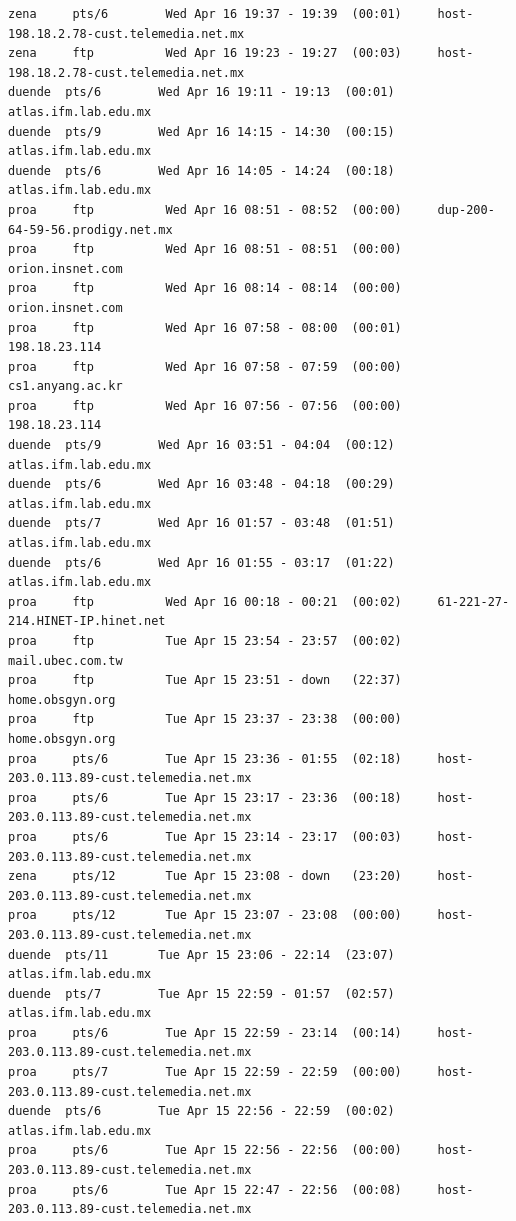 \begin{lstlisting}[style=terminal]
zena     pts/6        Wed Apr 16 19:37 - 19:39  (00:01)     host-198.18.2.78-cust.telemedia.net.mx
zena     ftp          Wed Apr 16 19:23 - 19:27  (00:03)     host-198.18.2.78-cust.telemedia.net.mx
duende  pts/6        Wed Apr 16 19:11 - 19:13  (00:01)     atlas.ifm.lab.edu.mx
duende  pts/9        Wed Apr 16 14:15 - 14:30  (00:15)     atlas.ifm.lab.edu.mx
duende  pts/6        Wed Apr 16 14:05 - 14:24  (00:18)     atlas.ifm.lab.edu.mx
proa     ftp          Wed Apr 16 08:51 - 08:52  (00:00)     dup-200-64-59-56.prodigy.net.mx
proa     ftp          Wed Apr 16 08:51 - 08:51  (00:00)     orion.insnet.com
proa     ftp          Wed Apr 16 08:14 - 08:14  (00:00)     orion.insnet.com
proa     ftp          Wed Apr 16 07:58 - 08:00  (00:01)     198.18.23.114
proa     ftp          Wed Apr 16 07:58 - 07:59  (00:00)     cs1.anyang.ac.kr
proa     ftp          Wed Apr 16 07:56 - 07:56  (00:00)     198.18.23.114
duende  pts/9        Wed Apr 16 03:51 - 04:04  (00:12)     atlas.ifm.lab.edu.mx
duende  pts/6        Wed Apr 16 03:48 - 04:18  (00:29)     atlas.ifm.lab.edu.mx
duende  pts/7        Wed Apr 16 01:57 - 03:48  (01:51)     atlas.ifm.lab.edu.mx
duende  pts/6        Wed Apr 16 01:55 - 03:17  (01:22)     atlas.ifm.lab.edu.mx
proa     ftp          Wed Apr 16 00:18 - 00:21  (00:02)     61-221-27-214.HINET-IP.hinet.net
proa     ftp          Tue Apr 15 23:54 - 23:57  (00:02)     mail.ubec.com.tw
proa     ftp          Tue Apr 15 23:51 - down   (22:37)     home.obsgyn.org
proa     ftp          Tue Apr 15 23:37 - 23:38  (00:00)     home.obsgyn.org
proa     pts/6        Tue Apr 15 23:36 - 01:55  (02:18)     host-203.0.113.89-cust.telemedia.net.mx
proa     pts/6        Tue Apr 15 23:17 - 23:36  (00:18)     host-203.0.113.89-cust.telemedia.net.mx
proa     pts/6        Tue Apr 15 23:14 - 23:17  (00:03)     host-203.0.113.89-cust.telemedia.net.mx
zena     pts/12       Tue Apr 15 23:08 - down   (23:20)     host-203.0.113.89-cust.telemedia.net.mx
proa     pts/12       Tue Apr 15 23:07 - 23:08  (00:00)     host-203.0.113.89-cust.telemedia.net.mx
duende  pts/11       Tue Apr 15 23:06 - 22:14  (23:07)     atlas.ifm.lab.edu.mx
duende  pts/7        Tue Apr 15 22:59 - 01:57  (02:57)     atlas.ifm.lab.edu.mx
proa     pts/6        Tue Apr 15 22:59 - 23:14  (00:14)     host-203.0.113.89-cust.telemedia.net.mx
proa     pts/7        Tue Apr 15 22:59 - 22:59  (00:00)     host-203.0.113.89-cust.telemedia.net.mx
duende  pts/6        Tue Apr 15 22:56 - 22:59  (00:02)     atlas.ifm.lab.edu.mx
proa     pts/6        Tue Apr 15 22:56 - 22:56  (00:00)     host-203.0.113.89-cust.telemedia.net.mx
proa     pts/6        Tue Apr 15 22:47 - 22:56  (00:08)     host-203.0.113.89-cust.telemedia.net.mx

\end{lstlisting}
